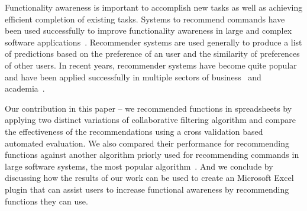 \documentclass{article} %
\begin{document}
Functionality awareness is important to accomplish new tasks as well as achieving efficient completion of existing tasks. Systems to recommend commands have been used successfully to improve functionality awareness in large and complex software applications~\cite{matejka2009communitycommands,murphy2012improving}. Recommender systems are used generally to produce a list of predictions based on the preference of an user and the similarity of preferences of other users. In recent years, recommender systems have become quite popular and have been applied successfully in multiple sectors of business~\cite{linden2003amazon} and academia~\cite{hsu2008personalized,mcnee2006don}. 

Our contribution in this paper -- we recommended functions in spreadsheets by applying two distinct variations of collaborative filtering algorithm and compare the effectiveness of the recommendations using a cross validation based automated evaluation. We also compared their performance for recommending functions against another algorithm priorly used for recommending commands in large software systems, the most popular algorithm~\cite{linton2000owl}. And we conclude by discussing how the results of our work can be used to create an Microsoft Excel plugin that can assist users to increase functional awareness by recommending functions they can use.




\end{document}

